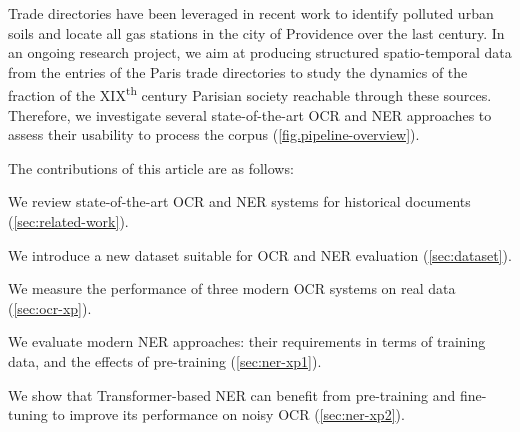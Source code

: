 Trade directories have been leveraged in recent work to identify polluted urban soils \cite{bell2020automated} and locate all gas stations in the city of Providence over the last century.
In an ongoing research project, we aim at producing structured spatio-temporal data from the entries of the Paris trade directories to study the dynamics of the fraction of the XIX\textsuperscript{th} century Parisian society reachable through these sources.
Therefore, we investigate several state-of-the-art OCR and NER approaches to assess their usability to process the corpus (\cref{fig.pipeline-overview}).

The contributions of this article are as follows:
\begin{enumerate*}[(i)]
    \item We review state-of-the-art OCR and NER systems for historical documents (\cref{sec:related-work}).
    \item We introduce a new dataset suitable for OCR and NER evaluation (\cref{sec:dataset}).
    \item We measure the performance of three modern OCR systems on real data (\cref{sec:ocr-xp}).
    \item We evaluate modern NER approaches: their requirements in terms of training data, and the effects of pre-training (\cref{sec:ner-xp1}).
    \item We show that Transformer-based NER can benefit from pre-training and fine-tuning to improve its performance on noisy OCR (\cref{sec:ner-xp2}).
\end{enumerate*}


